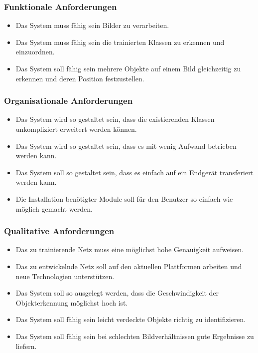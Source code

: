 \documentclass[a4paper,12pt,oneside]{article}
\begin{document}
  \subsubsection{Funktionale Anforderungen}
  
  \begin{itemize}
\item Das System muss fähig sein Bilder zu verarbeiten. 
\item Das System muss fähig sein die trainierten Klassen zu erkennen und einzuordnen.
\item Das System soll fähig sein mehrere Objekte auf einem Bild gleichzeitig zu erkennen und deren Position festzustellen.
  \end{itemize}  
	
  \subsubsection{Organisationale Anforderungen}
  
 \begin{itemize}
\item Das System wird so gestaltet sein, dass die existierenden Klassen unkompliziert erweitert werden können.
\item Das System wird so gestaltet sein, dass es mit wenig Aufwand betrieben werden kann.
\item Das System soll so gestaltet sein, dass es einfach auf ein Endgerät transferiert werden kann.
\item Die Installation benötigter Module soll für den Benutzer so einfach wie möglich gemacht werden.
  \end{itemize}
  
  \subsubsection{Qualitative Anforderungen}
  
 \begin{itemize}
\item Das zu trainierende Netz muss eine möglichst hohe Genauigkeit aufweisen. 
\item Das zu entwickelnde Netz soll auf den aktuellen Plattformen arbeiten und neue Technologien unterstützen.
\item Das System soll so ausgelegt werden, dass die Geschwindigkeit der Objekterkennung möglichst hoch ist.
\item Das System soll fähig sein leicht verdeckte Objekte richtig zu identifizieren.
\item Das System soll fähig sein bei schlechten Bildverhältnissen gute Ergebnisse zu liefern.
  \end{itemize}  
  
\end{document}
